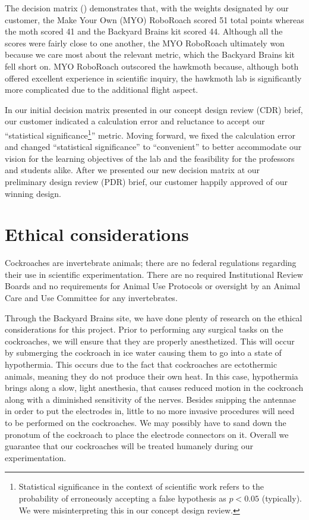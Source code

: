 \documentclass[twocolumn,10pt]{IEEEtran}
\begin{document}
The decision matrix () demonstrates that, with the weights designated by our customer, the Make Your Own (MYO) RoboRoach scored 51 total points whereas the moth scored 41 and the Backyard Brains kit scored 44. Although all the scores were fairly close to one another, the MYO RoboRoach ultimately won because we care most about the relevant metric, which the Backyard Brains kit fell short on. MYO RoboRoach outscored the hawkmoth because, although both offered excellent experience in scientific inquiry, the hawkmoth lab is significantly more complicated due to the additional flight aspect.

In our initial decision matrix presented in our concept design review (CDR) brief, our customer indicated a calculation error and reluctance to accept our ``statistical significance\footnote{Statistical significance in the context of scientific work refers to the probability of erroneously accepting a false hypothesis as $p<0.05$ (typically). We were misinterpreting this in our concept design review.}'' metric. Moving forward, we fixed the calculation error and changed ``statistical significance'' to ``convenient'' to better accommodate our vision for the learning objectives of the lab and the feasibility for the professors and students alike. After we presented our new decision matrix at our preliminary design review (PDR) brief, our customer happily approved of our winning design.

\section{Ethical considerations}
Cockroaches are invertebrate animals; there are no federal regulations regarding their use in scientific experimentation. There are no required Institutional Review Boards and no requirements for Animal Use Protocols or oversight by an Animal Care and Use Committee for any invertebrates.

Through the Backyard Brains site, we have done plenty of research on the ethical considerations for this project. Prior to performing any surgical tasks on the cockroaches, we will ensure that they are properly anesthetized. This will occur by submerging the cockroach in ice water causing them to go into a state of hypothermia. This occurs due to the fact that cockroaches are ectothermic animals, meaning they do not produce their own heat. In this case, hypothermia brings along a slow, light anesthesia, that causes reduced motion in the cockroach along with a diminished sensitivity of the nerves. Besides snipping the antennae in order to put the electrodes in, little to no more invasive procedures will need to be performed on the cockroaches. We may possibly have to sand down the pronotum of the cockroach to place the electrode connectors on it. Overall we guarantee that our cockroaches will be treated humanely during our experimentation.
\end{document}

